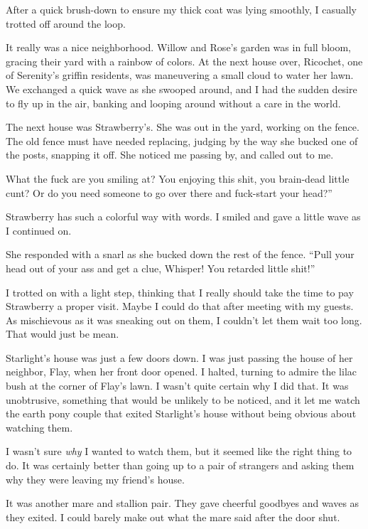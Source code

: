 After a quick brush-down to ensure my thick coat was lying smoothly, I casually trotted off around the loop.

It really was a nice neighborhood. Willow and Rose’s garden was in full bloom, gracing their yard with a rainbow of colors. At the next house over, Ricochet, one of Serenity’s griffin residents, was maneuvering a small cloud to water her lawn. We exchanged a quick wave as she swooped around, and I had the sudden desire to fly up in the air, banking and looping around without a care in the world.

The next house was Strawberry’s. She was out in the yard, working on the fence. The old fence must have needed replacing, judging by the way she bucked one of the posts, snapping it off. She noticed me passing by, and called out to me.

\leavevmode{}What the fuck are you smiling at? You enjoying this shit, you brain-dead little cunt? Or do you need someone to go over there and fuck-start your head?”

Strawberry has such a colorful way with words. I smiled and gave a little wave as I continued on.

She responded with a snarl as she bucked down the rest of the fence. “Pull your head out of your ass and get a clue, Whisper! You retarded little shit!”

I trotted on with a light step, thinking that I really should take the time to pay Strawberry a proper visit. Maybe I could do that after meeting with my guests. As mischievous as it was sneaking out on them, I couldn’t let them wait too long. That would just be mean.

Starlight’s house was just a few doors down. I was just passing the house of her neighbor, Flay, when her front door opened. I halted, turning to admire the lilac bush at the corner of Flay’s lawn. I wasn’t quite certain why I did that. It was unobtrusive, something that would be unlikely to be noticed, and it let me watch the earth pony couple that exited Starlight’s house without being obvious about watching them.

I wasn’t sure \textit{why} I wanted to watch them, but it seemed like the right thing to do. It was certainly better than going up to a pair of strangers and asking them why they were leaving my friend’s house.

It was another mare and stallion pair. They gave cheerful goodbyes and waves as they exited. I could barely make out what the mare said after the door shut.

